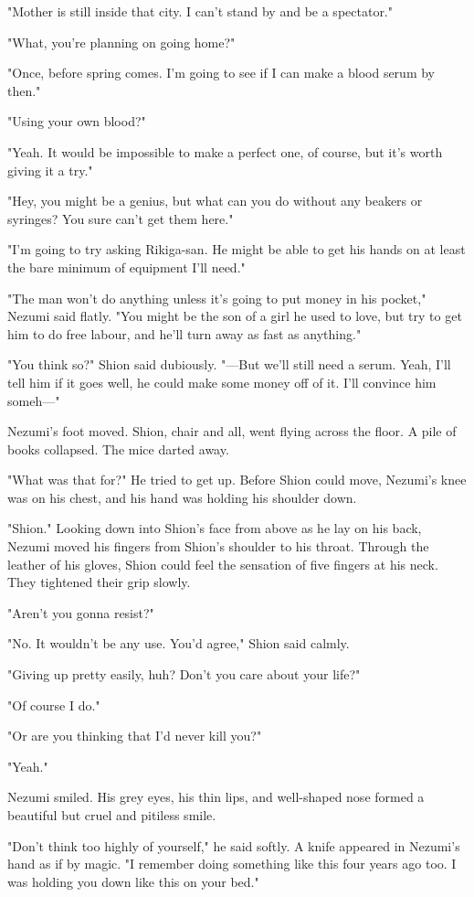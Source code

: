 "Mother is still inside that city. I can't stand by and be a spectator."

"What, you're planning on going home?"

"Once, before spring comes. I'm going to see if I can make a blood serum
by then."

"Using your own blood?"

"Yeah. It would be impossible to make a perfect one, of course, but it's
worth giving it a try."

"Hey, you might be a genius, but what can you do without any beakers or
syringes? You sure can't get them here."

"I'm going to try asking Rikiga-san. He might be able to get his hands
on at least the bare minimum of equipment I'll need."

"The man won't do anything unless it's going to put money in his
pocket," Nezumi said flatly. "You might be the son of a girl he used to
love, but try to get him to do free labour, and he'll turn away as fast
as anything."

"You think so?" Shion said dubiously. "---But we'll still need a serum.
Yeah, I'll tell him if it goes well, he could make some money off of it.
I'll convince him someh---"

Nezumi's foot moved. Shion, chair and all, went flying across the floor.
A pile of books collapsed. The mice darted away.

"What was that for?" He tried to get up. Before Shion could move,
Nezumi's knee was on his chest, and his hand was holding his shoulder
down.

"Shion." Looking down into Shion's face from above as he lay on his
back, Nezumi moved his fingers from Shion's shoulder to his throat.
Through the leather of his gloves, Shion could feel the sensation of
five fingers at his neck. They tightened their grip slowly.

"Aren't you gonna resist?"

"No. It wouldn't be any use. You'd agree," Shion said calmly.

"Giving up pretty easily, huh? Don't you care about your life?"

"Of course I do."

"Or are you thinking that I'd never kill you?"

"Yeah."

Nezumi smiled. His grey eyes, his thin lips, and well-shaped nose formed
a beautiful but cruel and pitiless smile.

"Don't think too highly of yourself," he said softly. A knife appeared
in Nezumi's hand as if by magic. "I remember doing something like this
four years ago too. I was holding you down like this on your bed."

